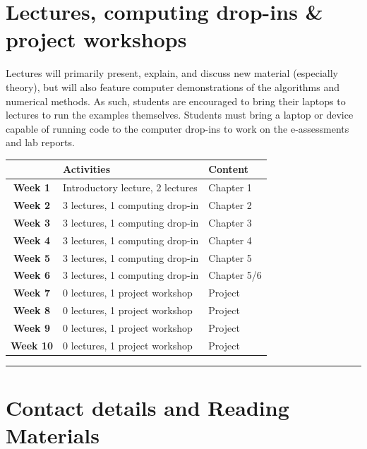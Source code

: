 \documentclass[
  letterpaper,
  DIV=11,
  numbers=noendperiod]{scrreprt}
\begin{document}
\section*{Lectures, computing drop-ins \& project
workshops}\label{lectures-computing-drop-ins-project-workshops}


Lectures will primarily present, explain, and discuss new material
(especially theory), but will also feature computer demonstrations of
the algorithms and numerical methods. As such, students are encouraged
to bring their laptops to lectures to run the examples themselves.
Students must bring a laptop or device capable of running code to the
computer drop-ins to work on the e-assessments and lab reports.

\begin{longtable}[]{@{}cll@{}}
\toprule\noalign{}
& Activities & Content \\
\midrule\noalign{}
\endhead
\bottomrule\noalign{}
\endlastfoot
\textbf{Week 1} & Introductory lecture, 2 lectures & Chapter 1 \\
\textbf{Week 2} & 3 lectures, 1 computing drop-in & Chapter 2 \\
\textbf{Week 3} & 3 lectures, 1 computing drop-in & Chapter 3 \\
\textbf{Week 4} & 3 lectures, 1 computing drop-in & Chapter 4 \\
\textbf{Week 5} & 3 lectures, 1 computing drop-in & Chapter 5 \\
\textbf{Week 6} & 3 lectures, 1 computing drop-in & Chapter 5/6 \\
\textbf{Week 7} & 0 lectures, 1 project workshop & Project \\
\textbf{Week 8} & 0 lectures, 1 project workshop & Project \\
\textbf{Week 9} & 0 lectures, 1 project workshop & Project \\
\textbf{Week 10} & 0 lectures, 1 project workshop & Project \\
\end{longtable}

\begin{center}\rule{0.5\linewidth}{0.5pt}\end{center}

\section*{Contact details and Reading
Materials}\label{contact-details-and-reading-materials}
\end{document}

